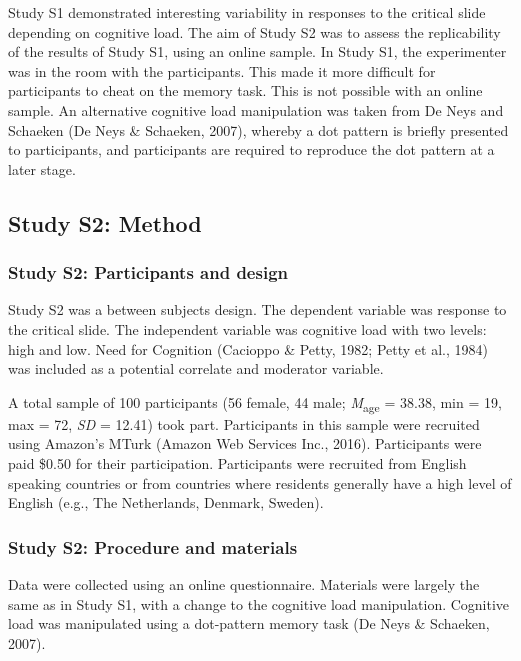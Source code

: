 \documentclass[
  man,floatsintext]{apa6}
\begin{document}
Study S1 demonstrated interesting variability in responses to the critical slide depending on cognitive load. The aim of Study S2 was to assess the replicability of the results of Study S1, using an online sample. In Study S1, the experimenter was in the room with the participants. This made it more difficult for participants to cheat on the memory task. This is not possible with an online sample. An alternative cognitive load manipulation was taken from De Neys and Schaeken (De Neys \& Schaeken, 2007), whereby a dot pattern is briefly presented to participants, and participants are required to reproduce the dot pattern at a later stage.

\hypertarget{study-s2-method}{%
\subsection{Study S2: Method}\label{study-s2-method}}

\hypertarget{study-s2-participants-and-design}{%
\subsubsection{Study S2: Participants and design}\label{study-s2-participants-and-design}}

Study S2 was a between subjects design. The dependent variable was response to the critical slide. The independent variable was cognitive load with two levels: high and low. Need for Cognition (Cacioppo \& Petty, 1982; Petty et al., 1984) was included as a potential correlate and moderator variable.

A total sample of 100 participants (56 female, 44 male; \emph{M}\textsubscript{age} = 38.38, min = 19, max = 72, \emph{SD} = 12.41) took part. Participants in this sample were recruited using Amazon's MTurk (Amazon Web Services Inc., 2016). Participants were paid \$0.50 for their participation. Participants were recruited from English speaking countries or from countries where residents generally have a high level of English (e.g., The Netherlands, Denmark, Sweden).

\hypertarget{study-s2-procedure-and-materials}{%
\subsubsection{Study S2: Procedure and materials}\label{study-s2-procedure-and-materials}}

Data were collected using an online questionnaire. Materials were largely the same as in Study S1, with a change to the cognitive load manipulation. Cognitive load was manipulated using a dot-pattern memory task (De Neys \& Schaeken, 2007).
\end{document}
